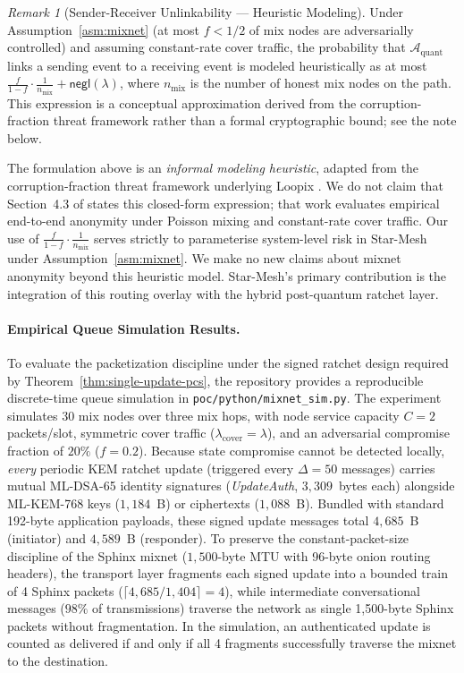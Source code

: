 \documentclass[11pt,a4paper]{article}
\theoremstyle{remark}
\newtheorem{remark}[theorem]{Remark}
\theoremstyle{plain}
\newcommand{\negl}{\mathsf{negl}}
\newcommand{\calA}{\mathcal{A}}
\begin{document}
\begin{remark}[Sender-Receiver Unlinkability — Heuristic Modeling]
\label{rem:unlinkability}
Under Assumption~\ref{asm:mixnet} (at most $f < 1/2$ of mix nodes are adversarially controlled)
and assuming constant-rate cover traffic, the probability that $\calA_{\mathrm{quant}}$ links a
sending event to a receiving event is modeled heuristically as at most $\frac{f}{1-f} \cdot \frac{1}{n_{\mathrm{mix}}} +
\negl(\lambda)$, where $n_{\mathrm{mix}}$ is the number of honest mix nodes on the path.
This expression is a conceptual approximation derived from the corruption-fraction threat framework
rather than a formal cryptographic bound; see the note below.
\end{remark}

\noindent The formulation above is an \emph{informal modeling heuristic}, adapted from the
corruption-fraction threat framework underlying Loopix \cite{loopix}.  We do not claim that
Section~4.3 of \cite{loopix} states this closed-form expression; that work evaluates
empirical end-to-end anonymity under Poisson mixing and constant-rate cover traffic.
Our use of $\frac{f}{1-f} \cdot \frac{1}{n_{\mathrm{mix}}}$ serves strictly to parameterise
system-level risk in Star-Mesh under Assumption~\ref{asm:mixnet}.  We make no new claims about
mixnet anonymity beyond this heuristic model.  Star-Mesh's primary contribution is the integration
of this routing overlay with the hybrid post-quantum ratchet layer.

\paragraph{Empirical Queue Simulation Results.}
To evaluate the packetization discipline under the signed ratchet design required by Theorem~\ref{thm:single-update-pcs}, the
repository provides a reproducible discrete-time queue simulation in \texttt{poc/python/mixnet\_sim.py}.
The experiment simulates 30 mix nodes over three mix hops, with node service capacity $C = 2$
packets/slot, symmetric cover traffic ($\lambda_{\mathrm{cover}} = \lambda$), and an adversarial compromise
fraction of $20\%$ ($f = 0.2$).  Because state compromise cannot be detected locally, \emph{every}
periodic KEM ratchet update (triggered every $\Delta = 50$ messages) carries mutual ML-DSA-65 identity
signatures (\emph{UpdateAuth}, $3{,}309$~bytes each) alongside ML-KEM-768 keys ($1{,}184$~B) or ciphertexts ($1{,}088$~B).
Bundled with standard 192-byte application payloads, these signed update messages total $4{,}685$~B (initiator)
and $4{,}589$~B (responder).  To preserve the constant-packet-size discipline of the Sphinx mixnet ($1{,}500$-byte MTU
with 96-byte onion routing headers), the transport layer fragments each signed update into a bounded train of
4 Sphinx packets ($\lceil 4{,}685 / 1{,}404 \rceil = 4$), while intermediate conversational messages
($98\%$ of transmissions) traverse the network as single 1{,}500-byte Sphinx packets without fragmentation.
In the simulation, an authenticated update is counted as delivered if and only if all 4 fragments successfully
traverse the mixnet to the destination.
\end{document}
